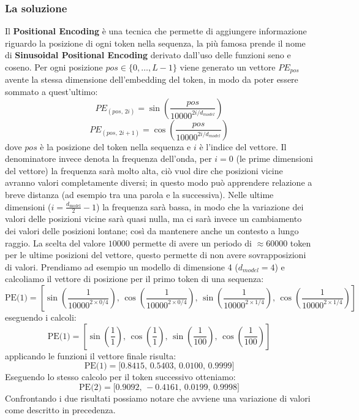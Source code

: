 \documentclass{article}
\begin{document}
\subsubsection{La soluzione}
Il \textbf{Positional Encoding} è una tecnica che permette di aggiungere informazione riguardo la posizione di ogni token nella sequenza, la più famosa prende il nome di \textbf{Sinusoidal Positional Encoding} derivato dall'uso delle funzioni seno e coseno.
Per ogni posizione $pos \in \{0,\dots,L-1\}$ viene generato un vettore $PE_{pos}$ avente la stessa dimensione dell'embedding del token, in modo da poter essere sommato a quest'ultimo:
$$PE_{(pos, \, 2i)} = \sin\left(\frac{pos}{10000^{2i / d_{model}}}\right)$$
$$PE_{(pos, \, 2i+1)} = \cos\left(\frac{pos}{10000^{2i / d_{model}}}\right)$$
dove $pos$ è la posizione del token nella sequenza e $i$ è l'indice del vettore.
Il denominatore invece denota la frequenza dell'onda, per $i=0$ (le prime dimensioni del vettore) la frequenza sarà molto alta, ciò vuol dire che posizioni vicine avranno valori completamente diversi; in questo modo può apprendere relazione a breve distanza (ad esempio tra una parola e la successiva). \newline
Nelle ultime dimensioni ($i = \frac{d_{\text{model}}}{2}-1$) la frequenza sarà bassa, in modo che la variazione dei valori delle posizioni vicine sarà quasi nulla, ma ci sarà invece un cambiamento dei valori delle posizioni lontane; così da mantenere anche un contesto a lungo raggio. \newline
La scelta del valore $10000$ permette di avere un periodo di $\approx 60000$ token per le ultime posizioni del vettore, questo permette di non avere sovrapposizioni di valori.
Prendiamo ad esempio un modello di dimensione 4 ($d_{model}=4$) e calcoliamo il vettore di posizione per il primo token di una sequenza: \newpage
$$\text{PE(1)} = \left[ \sin\left(\frac{1}{10000^{2\times 0/4}}\right), \, \cos\left(\frac{1}{10000^{2\times 0/4}}\right), \, \sin\left(\frac{1}{10000^{2\times 1/4}}\right), \, \cos\left(\frac{1}{10000^{2\times 1/4}}\right) \right]$$
eseguendo i calcoli:
$$\text{PE(1)} = \left[ \sin\left(\frac{1}{1}\right), \, \cos\left(\frac{1}{1}\right), \, \sin\left(\frac{1}{100}\right), \, \cos\left(\frac{1}{100}\right) \right]$$
applicando le funzioni il vettore finale risulta:
$$\text{PE(1)} = \big[ 0.8415, \, 0.5403, \, 0.0100, \, 0.9999 \big]$$
Eseguendo lo stesso calcolo per il token successivo otteniamo:
$$\text{PE(2)} = \big[ 0.9092, \, -0.4161, \, 0.0199, \, 0.9998 \big]$$
Confrontando i due risultati possiamo notare che avviene una variazione di valori come descritto in precedenza.
\end{document}
